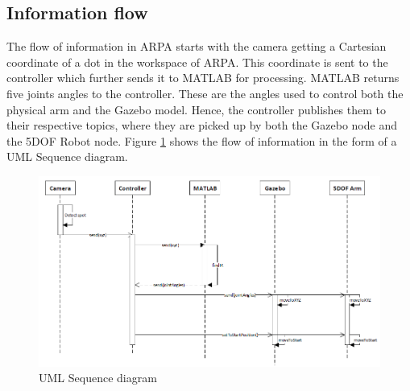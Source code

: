 \documentclass[11pt,a4paper]{report}
\begin{document}
	\subsection{Information flow}
	
	The flow of information in ARPA starts with the camera getting a Cartesian coordinate of a dot in the workspace of ARPA. This coordinate is sent to the controller which further sends it to MATLAB for processing. MATLAB returns five joints angles to the controller. These are the angles used to control both the physical arm and the Gazebo model. Hence, the controller publishes them to their respective topics, where they are picked up by both the Gazebo node and the 5DOF Robot node. Figure \ref{fig:seq-diagram} shows the flow of information in the form of a UML Sequence diagram.
	
	
	\begin{figure}[ht]
		\includegraphics[width=\linewidth]{../Diagrams/SequenceDiagram.png}
		\caption{UML Sequence diagram}
		\label{fig:seq-diagram}
	\end{figure}
	
	
	
	
	
\end{document}
